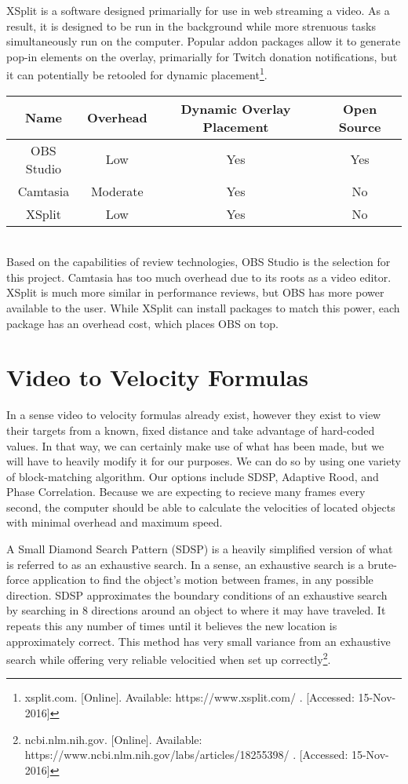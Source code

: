 \documentclass[letterpaper,10pt,onecolumn,draftclsnofoot]{IEEEtran}
\begin{document}
XSplit is a software designed primarially for use in web streaming a video.  As a result, it is designed to be run in the background while more strenuous tasks simultaneously run on the computer.  Popular addon packages allow it to generate pop-in elements on the overlay, primarially for Twitch donation notifications, but it can potentially be retooled for dynamic placement\footnote{xsplit.com. [Online]. Available: https://www.xsplit.com/ . [Accessed: 15-Nov-2016] }. \\

\begin{tabular}{|c|c|c|c|}
  \hline
  \textbf{Name} & \textbf{Overhead} & \textbf{Dynamic Overlay Placement} & \textbf{Open Source} \\
  \hline
  OBS Studio & Low & Yes & Yes \\ 
  \hline
  Camtasia & Moderate & Yes & No  \\ 
  \hline
  XSplit & Low & Yes & No \\ 
  \hline
\end{tabular} \\

Based on the capabilities of review technologies, OBS Studio is the selection for this project.  Camtasia has too much overhead due to its roots as a video editor.  XSplit is much more similar in performance reviews, but OBS has more power available to the user.  While XSplit can install packages to match this power, each package has an overhead cost, which places OBS on top.


\section{Video to Velocity Formulas} %

In a sense video to velocity formulas already exist, however they exist to view their targets from a known, fixed distance and take advantage of hard-coded values.  In that way, we can certainly make use of what has been made, but we will have to heavily modify it for our purposes.  We can do so by using one variety of block-matching algorithm.  Our options include SDSP, Adaptive Rood, and Phase Correlation.  Because we are expecting to recieve many frames every second, the computer should be able to calculate the velocities of located objects with minimal overhead and maximum speed.

A Small Diamond Search Pattern (SDSP) is a heavily simplified version of what is referred to as an exhaustive search.  In a sense, an exhaustive search is a brute-force application to find the object's motion between frames, in any possible direction.  SDSP approximates the boundary conditions of an exhaustive search by searching in 8 directions around an object to where it may have traveled.  It repeats this any number of times until it believes the new location is approximately correct.  This method has very small variance from an exhaustive search while offering very reliable velocitied when set up correctly\footnote{ncbi.nlm.nih.gov. [Online]. Available: https://www.ncbi.nlm.nih.gov/labs/articles/18255398/ . [Accessed: 15-Nov-2016] }.
\end{document}

